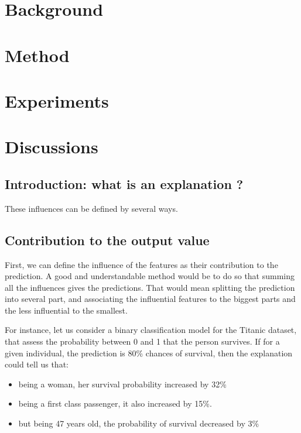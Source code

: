 \documentclass[a4paper,11pt]{kth-mag}
\begin{document}
\chapter{Background}

\chapter{Method}

\chapter{Experiments}

\chapter{Discussions}





\section{Introduction: what is an explanation ?}

These influences can be defined by several ways.

\section{Contribution to the output value}

First, we can define the influence of the features as their contribution to the prediction. A good and understandable method would be to do so that summing all the influences gives the predictions. That would mean splitting the prediction into several part, and associating the influential features to the biggest parts and the less influential to the smallest.

For instance, let us consider a binary classification model for the Titanic dataset, that assess the probability between 0 and 1 that the person survives.
If for a given individual, the prediction is 80\% chances of survival, then the explanation could tell us that:

\begin{itemize}
\item being a woman, her survival probability increased by 32\%
\item being a first class passenger, it also increased by 15\%.
\item but being 47 years old, the probability of survival decreased by 3\%
\end{itemize}
\end{document}
